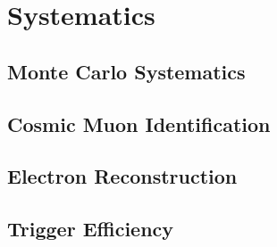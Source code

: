 \chapter{Systematics}

\section{Monte Carlo Systematics}

\section{Cosmic Muon Identification}

\section{Electron Reconstruction}

\section{Trigger Efficiency}
